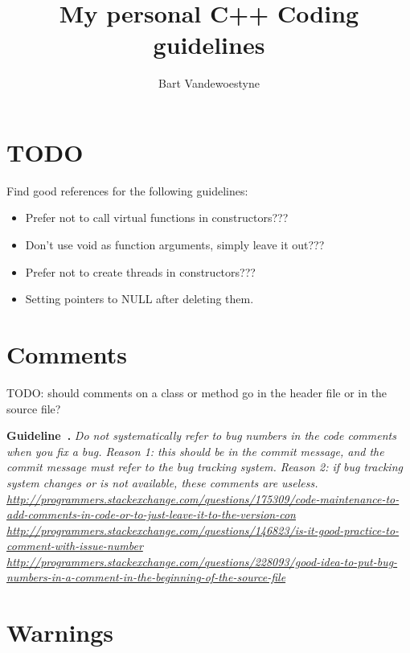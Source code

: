 \documentclass{article}
\title{My personal C++ Coding guidelines}
\author{Bart Vandewoestyne}
\newcounter{guideline}
\newenvironment{guideline}[1][]{\refstepcounter{guideline}\par\medskip
   \noindent \textbf{Guideline~\theguideline. #1} \em \rmfamily}{\medskip}
\begin{document}
	

\maketitle

\tableofcontents

\section{TODO}

Find good references for the following guidelines:
\begin{itemize}
\item Prefer not to call virtual functions in constructors???
\item Don't use void as function arguments, simply leave it out???
\item Prefer not to create threads in constructors???
\item Setting pointers to NULL after deleting them.
\end{itemize}

\section{Comments}

TODO: should comments on a class or method go in the header file or in the source file?

\begin{guideline}
Do not systematically refer to bug numbers in the code comments when you fix a bug.
Reason 1: this should be in the commit message, and the commit message must refer to the bug tracking system.
Reason 2: if bug tracking system changes or is not available, these comments are useless.
\url{http://programmers.stackexchange.com/questions/175309/code-maintenance-to-add-comments-in-code-or-to-just-leave-it-to-the-version-con}
\url{http://programmers.stackexchange.com/questions/146823/is-it-good-practice-to-comment-with-issue-number}
\url{http://programmers.stackexchange.com/questions/228093/good-idea-to-put-bug-numbers-in-a-comment-in-the-beginning-of-the-source-file}
\end{guideline}

\section{Warnings}
\end{document}
